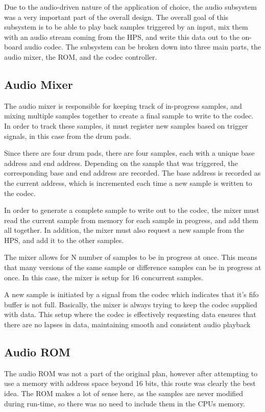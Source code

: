\documentclass{subfile}
\begin{document}
  Due to the audio-driven nature of the application of choice, the audio subsystem
  was a very important part of the overall design. 
  The overall goal of this subsystem is to be able to play back samples triggered 
  by an input, mix them with an audio stream coming from the HPS, and write this 
  data out to the on-board audio codec.
  The subsystem can be broken down into three main parts, the audio mixer, the ROM, and the 
  codec controller.

  \subsection{Audio Mixer}
  The audio mixer is responsible for keeping track of in-progress samples,
  and mixing multiple samples together to create a final sample to write to the codec.
  In order to track these samples, it must register new samples based on trigger 
  signals, in this case from the drum pads.

  Since there are four drum pads, there are four samples, each with a unique base 
  address and end address. 
  Depending on the sample that was triggered, the corresponding base and end address are recorded. 
  The base address is recorded as the current address, which is incremented each time a new 
  sample is written to the codec.

  In order to generate a complete sample to write out to the codec, the mixer must read the current 
  sample from memory for each sample in progress, and add them all together.
  In addition, the mixer must also request a new sample from the HPS, and add it to the other samples.

  The mixer allows for N number of samples to be in progress at once. 
  This means that many versions of the same sample or difference samples can be in progress at once.
  In this case, the mixer is setup for 16 concurrent samples.

  A new sample is initiated by a signal from the codec which indicates that it's fifo buffer is not full. 
  Basically, the mixer is always trying to keep the codec supplied with data. 
  This setup where the codec is effectively requesting data ensures that there are no lapses in data, 
  maintaining smooth and consistent audio playback

  \subsection{Audio ROM}
  The audio ROM was not a part of the original plan, however after attempting to 
  use a memory with address space beyond 16 bits, this route was clearly the best 
  idea. 
  The ROM makes a lot of sense here, as the samples are never modified during 
  run-time, so there was no need to include them in the CPUs memory.
\end{document}
